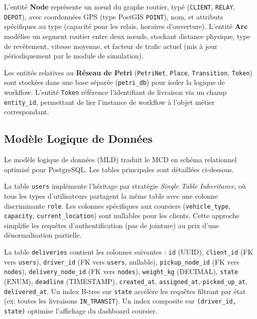 L'entité \textbf{Node} représente un nœud du graphe routier, typé (\texttt{CLIENT}, \texttt{RELAY}, \texttt{DEPOT}), avec coordonnées GPS (type PostGIS \texttt{POINT}), nom, et attributs spécifiques au type (capacité pour les relais, horaires d'ouverture). L'entité \textbf{Arc} modélise un segment routier entre deux nœuds, stockant distance physique, type de revêtement, vitesse moyenne, et facteur de trafic actuel (mis à jour périodiquement par le module de simulation).

Les entités relatives au \textbf{Réseau de Petri} (\texttt{PetriNet}, \texttt{Place}, \texttt{Transition}, \texttt{Token}) sont stockées dans une base séparée (\texttt{petri\_db}) pour isoler la logique de workflow. L'entité \texttt{Token} référence l'identifiant de livraison via un champ \texttt{entity\_id}, permettant de lier l'instance de workflow à l'objet métier correspondant.

\subsection{Modèle Logique de Données}

Le modèle logique de données (MLD) traduit le MCD en schéma relationnel optimisé pour PostgreSQL. Les tables principales sont détaillées ci-dessous.

La table \texttt{users} implémente l'héritage par stratégie \textit{Single Table Inheritance}, où tous les types d'utilisateurs partagent la même table avec une colonne discriminante \texttt{role}. Les colonnes spécifiques aux coursiers (\texttt{vehicle\_type}, \texttt{capacity}, \texttt{current\_location}) sont nullables pour les clients. Cette approche simplifie les requêtes d'authentification (pas de jointure) au prix d'une dénormalisation partielle.

La table \texttt{deliveries} contient les colonnes suivantes : \texttt{id} (UUID), \texttt{client\_id} (FK vers \texttt{users}), \texttt{driver\_id} (FK vers \texttt{users}, nullable), \texttt{pickup\_node\_id} (FK vers \texttt{nodes}), \texttt{delivery\_node\_id} (FK vers \texttt{nodes}), \texttt{weight\_kg} (DECIMAL), \texttt{state} (ENUM), \texttt{deadline} (TIMESTAMP), \texttt{created\_at}, \texttt{assigned\_at}, \texttt{picked\_up\_at}, \texttt{delivered\_at}. Un index B-tree sur \texttt{state} accélère les requêtes filtrant par état (ex: toutes les livraisons \texttt{IN\_TRANSIT}). Un index composite sur \texttt{(driver\_id, state)} optimise l'affichage du dashboard coursier.

